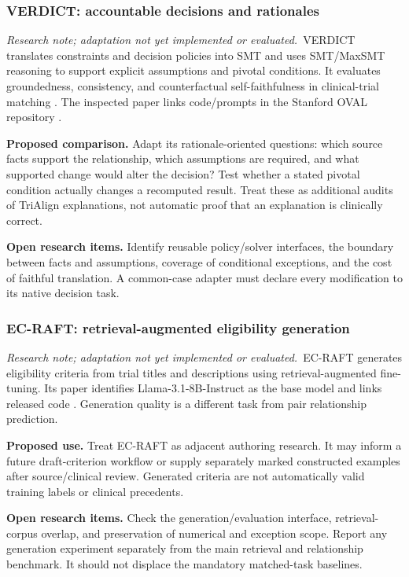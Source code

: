 \documentclass[10pt,letterpaper]{article}
\newcommand{\research}{\textit{Research note; adaptation not yet implemented or evaluated.}}
\begin{document}
\subsubsection{VERDICT: accountable decisions and rationales}
\research\ VERDICT translates constraints and decision policies into SMT
and uses SMT/MaxSMT reasoning to support explicit assumptions and pivotal
conditions. It evaluates groundedness, consistency, and counterfactual
self-faithfulness in clinical-trial matching \cite{verdict}. The inspected
paper links code/prompts in the Stanford OVAL repository \cite{satircode}.

\textbf{Proposed comparison.} Adapt its rationale-oriented questions:
which source facts support the relationship, which assumptions are required,
and what supported change would alter the decision? Test whether a stated
pivotal condition actually changes a recomputed result. Treat these as
additional audits of TriAlign explanations, not automatic proof that an
explanation is clinically correct.

\textbf{Open research items.} Identify reusable policy/solver interfaces,
the boundary between facts and assumptions, coverage of conditional
exceptions, and the cost of faithful translation. A common-case adapter must
declare every modification to its native decision task.

\subsubsection{EC-RAFT: retrieval-augmented eligibility generation}
\research\ EC-RAFT generates eligibility criteria from trial titles and
descriptions using retrieval-augmented fine-tuning. Its paper identifies
Llama-3.1-8B-Instruct as the base model and links released code \cite{ecraft}.
Generation quality is a different task from pair relationship prediction.

\textbf{Proposed use.} Treat EC-RAFT as adjacent authoring research. It may
inform a future draft-criterion workflow or supply separately marked
constructed examples after source/clinical review. Generated criteria are
not automatically valid training labels or clinical precedents.

\textbf{Open research items.} Check the generation/evaluation interface,
retrieval-corpus overlap, and preservation of numerical and exception scope.
Report any generation experiment separately from the main retrieval and
relationship benchmark. It should not displace the mandatory matched-task
baselines.
\end{document}
